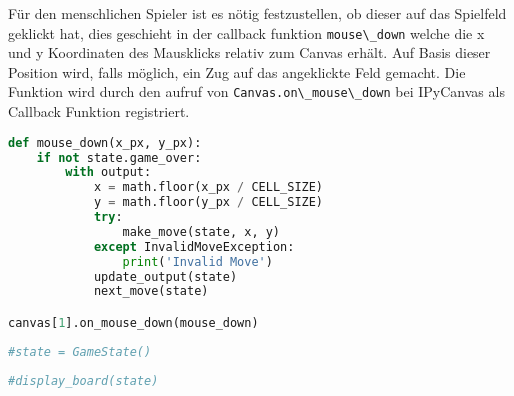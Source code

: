 Für den menschlichen Spieler ist es nötig festzustellen, ob dieser auf
das Spielfeld geklickt hat, dies geschieht in der callback funktion
\passthrough{\lstinline!mouse\_down!} welche die x und y Koordinaten des
Mausklicks relativ zum Canvas erhält. Auf Basis dieser Position wird,
falls möglich, ein Zug auf das angeklickte Feld gemacht. Die Funktion
wird durch den aufruf von
\passthrough{\lstinline!Canvas.on\_mouse\_down!} bei IPyCanvas als
Callback Funktion registriert.

\begin{lstlisting}[language=Python]
def mouse_down(x_px, y_px):
    if not state.game_over:
        with output:
            x = math.floor(x_px / CELL_SIZE)
            y = math.floor(y_px / CELL_SIZE)
            try:
                make_move(state, x, y)
            except InvalidMoveException:
                print('Invalid Move')
            update_output(state)
            next_move(state)

canvas[1].on_mouse_down(mouse_down)
\end{lstlisting}

\begin{lstlisting}[language=Python]
#state = GameState()
\end{lstlisting}

\begin{lstlisting}[language=Python]
#display_board(state)
\end{lstlisting}

\begin{lstlisting}[language=Python]
\end{lstlisting}
